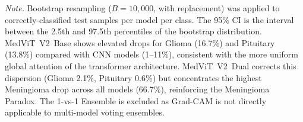 \documentclass[12pt]{article}
\begin{document}
\vspace{1em}
\noindent\textit{Note.} Bootstrap resampling ($B=10{,}000$, with replacement)
was applied to correctly-classified test samples per model per class.
The 95\% CI is the interval between the 2.5th and 97.5th percentiles
of the bootstrap distribution.
MedViT~V2~Base shows elevated drops for Glioma (16.7\%) and Pituitary
(13.8\%) compared with CNN models (1--11\%), consistent with the more
uniform global attention of the transformer architecture.
MedViT~V2~Dual corrects this dispersion (Glioma 2.1\%, Pituitary 0.6\%)
but concentrates the highest Meningioma drop across all models (66.7\%),
reinforcing the Meningioma Paradox.
The 1-vs-1 Ensemble is excluded as Grad-CAM is not directly applicable
to multi-model voting ensembles.
\end{document}
